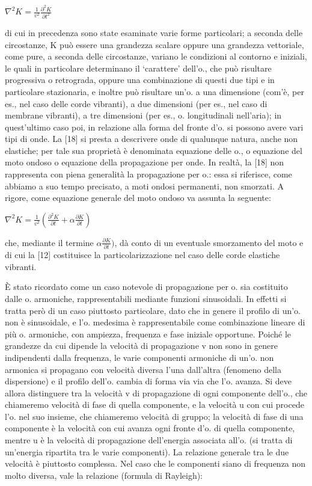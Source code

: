\documentclass[a4paper]{article}
\begin{document}
$\nabla^2 K = \frac{1}{v^2}\frac{\partial^2 K}{\partial t^2}$

di cui in precedenza sono state esaminate varie forme particolari; a seconda delle circostanze, K può essere una grandezza scalare oppure una grandezza vettoriale, come pure, a seconda delle circostanze, variano le condizioni al contorno e iniziali, le quali in particolare determinano il ‘carattere’ dell’o., che può risultare progressiva o retrograda, oppure una combinazione di questi due tipi e in particolare stazionaria, e inoltre può risultare un’o. a una dimensione (com’è, per es., nel caso delle corde vibranti), a due dimensioni (per es., nel caso di membrane vibranti), a tre dimensioni (per es., o. longitudinali nell’aria); in quest’ultimo caso poi, in relazione alla forma del fronte d’o. si possono avere vari tipi di onde. La [18] si presta a descrivere onde di qualunque natura, anche non elastiche; per tale sua proprietà è denominata equazione delle o., o equazione del moto ondoso o equazione della propagazione per onde. In realtà, la [18] non rappresenta con piena generalità la propagazione per o.: essa si riferisce, come abbiamo a suo tempo precisato, a moti ondosi permanenti, non smorzati. A rigore, come equazione generale del moto ondoso va assunta la seguente:

$\nabla^2 K=\frac{1}{v^2}(\frac{\partial^2 K}{\partial t}+\alpha\frac{\partial K}{\partial t})$

che, mediante il termine $\alpha\frac{\partial K}{\partial t})$, dà conto di un eventuale smorzamento del moto e di cui la [12] costituisce la particolarizzazione nel caso delle corde elastiche vibranti.

È stato ricordato come un caso notevole di propagazione per o. sia costituito dalle o. armoniche, rappresentabili mediante funzioni sinusoidali. In effetti si tratta però di un caso piuttosto particolare, dato che in genere il profilo di un’o. non è sinusoidale, e l’o. medesima è rappresentabile come combinazione lineare di più o. armoniche, con ampiezza, frequenza e fase iniziale opportune. Poiché le grandezze da cui dipende la velocità di propagazione v non sono in genere indipendenti dalla frequenza, le varie componenti armoniche di un’o. non armonica si propagano con velocità diversa l’una dall’altra (fenomeno della dispersione) e il profilo dell’o. cambia di forma via via che l’o. avanza. Si deve allora distinguere tra la velocità v di propagazione di ogni componente dell’o., che chiameremo velocità di fase di quella componente, e la velocità u con cui procede l’o. nel suo insieme, che chiameremo velocità di gruppo; la velocità di fase di una componente è la velocità con cui avanza ogni fronte d’o. di quella componente, mentre u è la velocità di propagazione dell’energia associata all’o. (si tratta di un’energia ripartita tra le varie componenti). La relazione generale tra le due velocità è piuttosto complessa. Nel caso che le componenti siano di frequenza non molto diversa, vale la relazione (formula di Rayleigh): 
\end{document}
